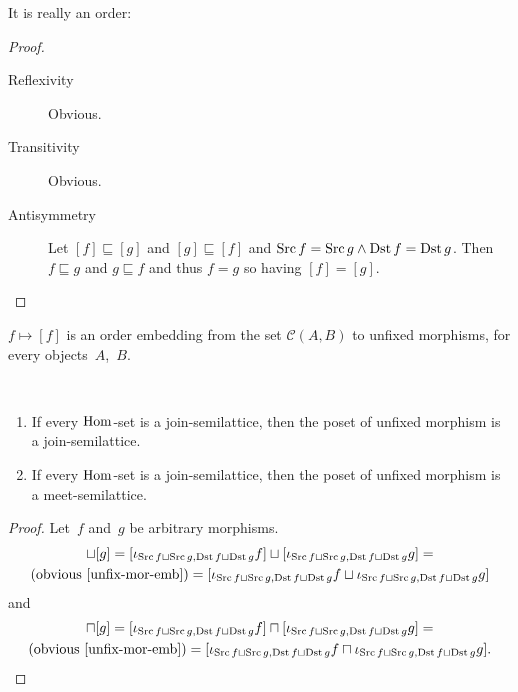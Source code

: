 It is really an order:

\begin{proof}
~
\begin{description}
\item[Reflexivity] Obvious.
\item[Transitivity] Obvious.
\item[Antisymmetry] Let $[f]\sqsubseteq[g]$ and
$[g]\sqsubseteq[f]$ and $\operatorname{Src} f=\operatorname{Src} g\land\operatorname{Dst} f=\operatorname{Dst} g$.
Then $f\sqsubseteq g$ and $g\sqsubseteq f$ and thus
$f=g$ so having $[f]=[g]$.
\end{description}
\end{proof}

\begin{obvious}\label{unfix-mor-emb}
$f\mapsto[f]$ is an order embedding from the set
$\mathcal{C}(A,B)$ to unfixed morphisms, for every
objects~$A$,~$B$.
\end{obvious}

\begin{prop}
~
\begin{enumerate}
\item If every $\operatorname{Hom}$-set is a join-semilattice, then
the poset of unfixed morphism is a join-semilattice.
\item If every $\operatorname{Hom}$-set is a join-semilattice, then
the poset of unfixed morphism is a meet-semilattice.
\end{enumerate}
\end{prop}

\begin{proof}
Let~$f$ and~$g$ be arbitrary morphisms.
\begin{multline*}
[f]\sqcup[g] =
[\iota_{\Src f\sqcup\Src g,\Dst f\sqcup\Dst g}f]\sqcup
[\iota_{\Src f\sqcup\Src g,\Dst f\sqcup\Dst g}g] = \\
\text{(obvious~\ref{unfix-mor-emb})} =
[\iota_{\Src f\sqcup\Src g,\Dst f\sqcup\Dst g}f\sqcup
\iota_{\Src f\sqcup\Src g,\Dst f\sqcup\Dst g}g]
\end{multline*}
and
\begin{multline*}
[f]\sqcap[g] =
[\iota_{\Src f\sqcup\Src g,\Dst f\sqcup\Dst g}f]\sqcap
[\iota_{\Src f\sqcup\Src g,\Dst f\sqcup\Dst g}g] = \\
\text{(obvious~\ref{unfix-mor-emb})} =
[\iota_{\Src f\sqcup\Src g,\Dst f\sqcup\Dst g}f\sqcap
\iota_{\Src f\sqcup\Src g,\Dst f\sqcup\Dst g}g].
\end{multline*}
\end{proof}

